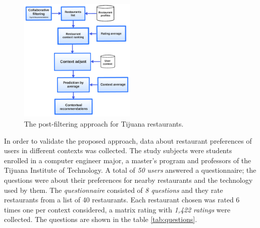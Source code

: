 \begin{figure}
\centering
\captionsetup{font=footnotesize}
\setlength\fboxsep{0pt}
\includegraphics[width=0.50\textwidth]{img/posfil.png}
\caption{The post-filtering approach for Tijuana restaurants.}
\label{fig:postfiltering}     
\end{figure}
In order to validate the proposed approach, data about restaurant
preferences of users in different contexts was collected. The study
subjects were students enrolled in a computer engineer major, a
master’s program and professors of the Tijuana Institute of
Technology. A total of \textit{50 users} answered a questionnaire; the
questions were about their preferences for nearby restaurants and the
technology used by them. The \textit{questionnaire} consisted of \textit{8
questions} and they rate restaurants from a list of 40 restaurants.
Each restaurant chosen was rated 6 times one per context considered, a
matrix rating with \textit{1,422 ratings} were collected. The
questions are shown in the table \ref{tab:questions}.
